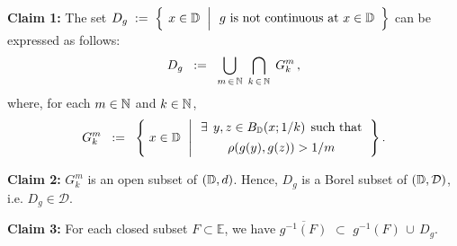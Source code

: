\vskip 0.3cm
\noindent
\textbf{Claim 1:}\;\;
The set\;
$D_{g}
\; := \;
	\left\{\;\left.
		x\overset{{\color{white}.}}{\in}\D
		\;\;\right\vert
		\begin{array}{c}\textnormal{$g$ is not continuous at $x\in\D$}\end{array}
		\right\}$
\;can be expressed as follows:
\begin{equation*}
D_{g}
\;\; := \;\;
	\underset{m\,\in\,\mathbb{N}}{\bigcup}\;\,
	\underset{k\,\in\,\mathbb{N}}{\bigcap}\;\,
	G^{m}_{k}\,,
\end{equation*}
where, for each $m\in\mathbb{N}$ and $k\in\mathbb{N}$,
\begin{equation*}
G^{m}_{k}
\;\; := \;\;
	\left\{\;
		x\overset{{\color{white}.}}{\in}\D
		\;\,\left\vert\,
		\begin{array}{c} \exists \;\,y,z \in B_{\D}(x;1/k) \;\,\textnormal{such that} \\ \rho(g(y),g(z)) \overset{{\color{white}-}}{>} 1/m \end{array}
		\right.
		\right\}.
\end{equation*}

\vskip 0.5cm
\noindent
\textbf{Claim 2:}\;\;
$G^{m}_{k}$ is an open subset of $(\mathbb{D},d)$. Hence, $D_{g}$ is a Borel subset of $(\mathbb{D},\mathcal{D})$, i.e. $D_{g} \in \mathcal{D}$.

\vskip 0.5cm
\noindent
\textbf{Claim 3:}\;\;
For each closed subset $F \subset \mathbb{E}$, we have\;
$\overline{g^{-1}(F)}$ \;$\subset$\; $g^{-1}(F)\,\cup\,D_{g}$.

